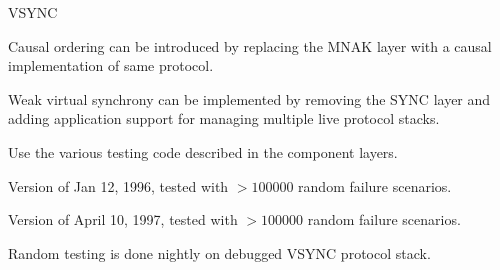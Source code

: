 \begin{Stack}{VSYNC}
\begin{Properties}
\item
{}
\end{Properties}

\begin{Notes}
\item
Causal ordering can be introduced by replacing the MNAK layer with a
causal implementation of same protocol.
\item
Weak virtual synchrony can be implemented by removing the SYNC layer
and adding application support for managing multiple live protocol
stacks.
\end{Notes}

\begin{Testing}
\item
Use the various testing code described in the component layers.
\item
Version of Jan 12, 1996, tested with $>100000$ random failure scenarios.
\item
Version of April 10, 1997, tested with $>100000$ random failure scenarios.
\item
Random testing is done nightly on debugged VSYNC protocol stack.
\end{Testing}
\end{Stack}
